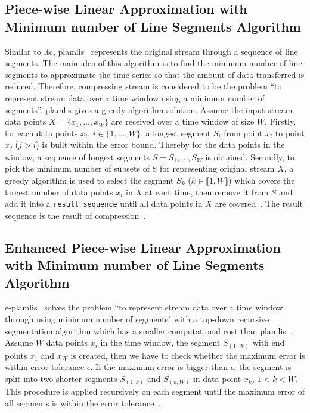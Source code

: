 \subsection{Piece-wise Linear Approximation
with Minimum number of Line Segments Algorithm}

Similar to \acrshort{ltc}, \acrfull{plamlis}~\cite{liu2007energy} represents the
original stream through a sequence of line segments. The main idea of this
algorithm is to find the minimum number of line segments to approximate the time
series so that the amount of data transferred is reduced. Therefore, compressing
stream is considered to be the problem ``to represent stream data over a time
window using a minimum number of segments''. \acrshort{plamlis} gives a greedy
algorithm solution. Assume the input stream data points $X=\{x_1, ..., x_W\}$
are received over a time window of size $W$. Firstly, for each data points
$x_i$, $i \in \{1, ..., W\}$, a longest segment $S_{i}$ from point $x_i$ to
point $x_j$ ($j>i$) is built within the error bound. Thereby for the data points
in the window, a sequence of longest segments $S = {S_1, ..., S_W}$ is obtained.
Secondly, to pick the minimum number of subsets of S for representing original
stream $X$, a greedy algorithm is used to select the segment $S_k$ ($k \in
\llbracket1, W\rrbracket$) which covers the largest number of data points $x_i$
in $X$ at each time, then remove it from $S$ and add it into a \texttt{result
sequence} until all data points in $X$ are covered~\cite{liu2007energy}. The
result sequence is the result of compression~\cite{zordan2012compress,
zordan2014performance}.


\subsection{Enhanced Piece-wise Linear Approximation with Minimum number of Line
Segments Algorithm}

\acrfull{e-plamlis}~\cite{pham2008enhance} solves the problem ``to represent
stream data over a time window through using minimum number of segments" with a
top-down recursive segmentation algorithm which has a smaller computational cost
than \acrshort{plamlis}~\cite{pham2008enhance, zordan2014performance}. Assume
$W$ data points $x_i$ in the time window, the segment $S_{(1, W)}$ with end
points $x_1$ and $x_W$ is created, then we have to check whether the maximum
error is within error tolerance $\epsilon$. If the maximum error is bigger than
$\epsilon$, the segment is split into two shorter segments $S_{(1, k)}$ and
$S_{(k, W)}$ in data point $x_k$, $1<k<W$. This procedure is applied recursively
on each segment until the maximum error of all segments is within the error
tolerance~\cite{pham2008enhance, zordan2014performance}.

